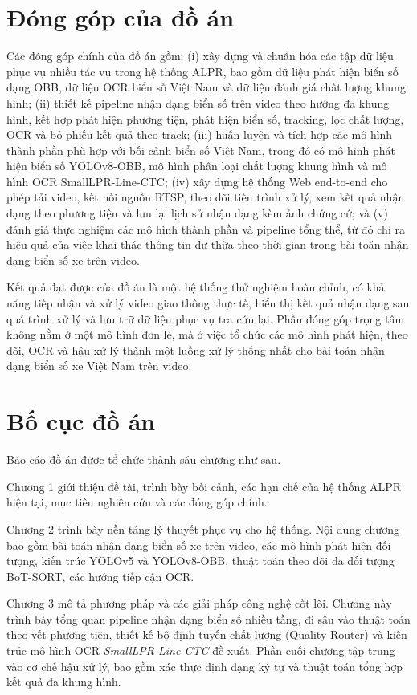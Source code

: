 \documentclass[../DoAn.tex]{subfiles}
\begin{document}
\section{Đóng góp của đồ án}
\label{section:1.4}
Các đóng góp chính của đồ án gồm: (i) xây dựng và chuẩn hóa các tập dữ liệu phục vụ nhiều tác vụ trong hệ thống ALPR, bao gồm dữ liệu phát hiện biển số dạng OBB, dữ liệu OCR biển số Việt Nam và dữ liệu đánh giá chất lượng khung hình; (ii) thiết kế pipeline nhận dạng biển số trên video theo hướng đa khung hình, kết hợp phát hiện phương tiện, phát hiện biển số, tracking, lọc chất lượng, OCR và bỏ phiếu kết quả theo track; (iii) huấn luyện và tích hợp các mô hình thành phần phù hợp với bối cảnh biển số Việt Nam, trong đó có mô hình phát hiện biển số YOLOv8-OBB, mô hình phân loại chất lượng khung hình và mô hình OCR SmallLPR-Line-CTC; (iv) xây dựng hệ thống Web end-to-end cho phép tải video, kết nối nguồn RTSP, theo dõi tiến trình xử lý, xem kết quả nhận dạng theo phương tiện và lưu lại lịch sử nhận dạng kèm ảnh chứng cứ; và (v) đánh giá thực nghiệm các mô hình thành phần và pipeline tổng thể, từ đó chỉ ra hiệu quả của việc khai thác thông tin dư thừa theo thời gian trong bài toán nhận dạng biển số xe trên video.

Kết quả đạt được của đồ án là một hệ thống thử nghiệm hoàn chỉnh, có khả năng tiếp nhận và xử lý video giao thông thực tế, hiển thị kết quả nhận dạng sau quá trình xử lý và lưu trữ dữ liệu phục vụ tra cứu lại. Phần đóng góp trọng tâm không nằm ở một mô hình đơn lẻ, mà ở việc tổ chức các mô hình phát hiện, theo dõi, OCR và hậu xử lý thành một luồng xử lý thống nhất cho bài toán nhận dạng biển số xe Việt Nam trên video.

\section{Bố cục đồ án}
\label{section:1.5}
Báo cáo đồ án được tổ chức thành sáu chương như sau.

Chương 1 giới thiệu đề tài, trình bày bối cảnh, các hạn chế của hệ thống ALPR hiện tại, mục tiêu nghiên cứu và các đóng góp chính.

Chương 2 trình bày nền tảng lý thuyết phục vụ cho hệ thống. Nội dung chương bao gồm bài toán nhận dạng biển số xe trên video, các mô hình phát hiện đối tượng, kiến trúc YOLOv5 và YOLOv8-OBB, thuật toán theo dõi đa đối tượng BoT-SORT, các hướng tiếp cận OCR.

Chương 3 mô tả phương pháp và các giải pháp công nghệ cốt lõi. Chương này trình bày tổng quan pipeline nhận dạng biển số nhiều tầng, đi sâu vào thuật toán theo vết phương tiện, thiết kế bộ định tuyến chất lượng (Quality Router) và kiến trúc mô hình OCR \textit{SmallLPR-Line-CTC} đề xuất. Phần cuối chương tập trung vào cơ chế hậu xử lý, bao gồm xác thực định dạng ký tự và thuật toán tổng hợp kết quả đa khung hình.
\end{document}
